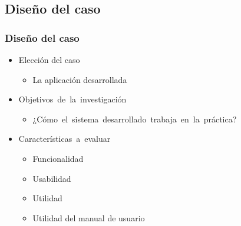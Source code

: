 \documentclass[9pt]{beamer}
\begin{document}
    \subsection{Diseño del caso}
    \begin{frame}
        \frametitle{Diseño del caso}                       
        
        \begin{itemize}
            \item Elección del caso
            \begin{itemize}
                \item La aplicación desarrollada
            \end{itemize}

            \item Objetivos de la investigación
            \begin{itemize}
                \item ¿Cómo el sistema desarrollado trabaja en la práctica?
            \end{itemize}

            \item Características a evaluar
            \begin{itemize}
                \item Funcionalidad
                \item Usabilidad
                \item Utilidad
                \item Utilidad del manual de usuario
            \end{itemize}
        \end{itemize}

    \end{frame}
\end{document}
